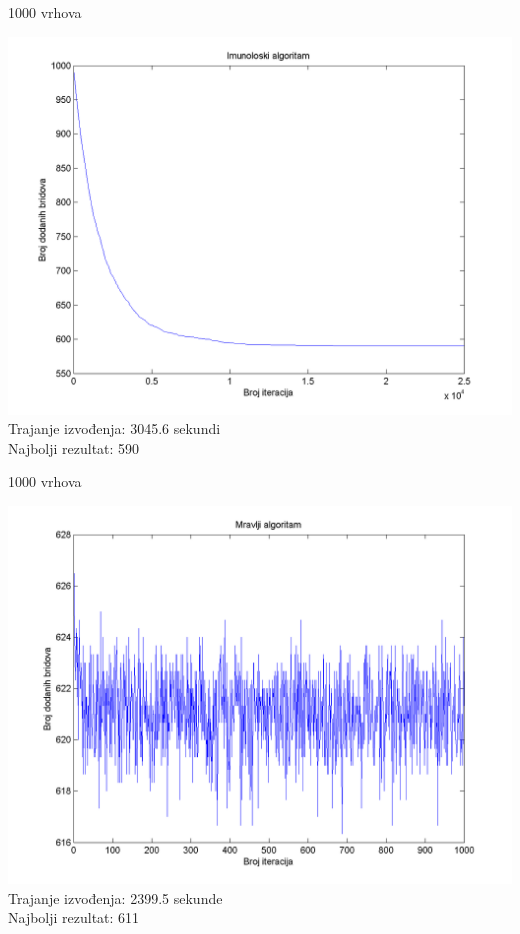 \documentclass{beamer}
\begin{document}
\begin{frame}{1000 vrhova}
\begin{center}
\includegraphics[scale = 0.4]{Im1000.png}\\
Trajanje izvođenja: 3045.6 sekundi\\
Najbolji rezultat: 590\\
\end{center}
\end{frame}

\begin{frame}{1000 vrhova}
\begin{center}
\includegraphics[scale = 0.4]{Mr1000.png}\\
Trajanje izvođenja: 2399.5 sekunde\\
Najbolji rezultat: 611\\
\end{center}
\end{frame}
\end{document}
